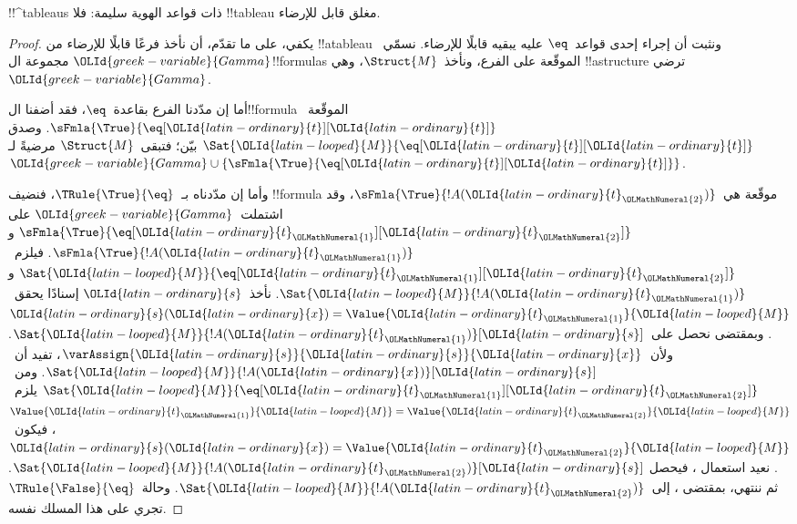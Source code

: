 \documentclass[../../../include/open-logic-section]{subfiles}
\begin{document}


\begin{prop}
!!^{tableau}s ذات قواعد الهوية سليمة: فلا !!{tableau} مغلق قابل للإرضاء.
\end{prop}

\begin{proof}
يكفي، على ما تقدّم، أن نأخذ فرعًا قابلًا للإرضاء من !!a{tableau}
ونثبت أن إجراء إحدى قواعد~$\eq$ عليه يبقيه قابلًا للإرضاء.
نسمّي~$\OLId{greek-variable}{Gamma}$ مجموعة ال!!{formula}s الموقّعة على الفرع،
ونأخذ~$\Struct{M}$، وهي !!a{structure} ترضي~$\OLId{greek-variable}{Gamma}$.

أما إن مدّدنا الفرع بقاعدة~$\eq$، فقد أضفنا ال!!{formula}
الموقّعة~$\sFmla{\True}{\eq[\OLId{latin-ordinary}{t}][\OLId{latin-ordinary}{t}]}$. وصدق
$\Sat{\OLId{latin-looped}{M}}{\eq[\OLId{latin-ordinary}{t}][\OLId{latin-ordinary}{t}]}$ بيّن؛ فتبقى~$\Struct{M}$ مرضيةً
لـ~$\OLId{greek-variable}{Gamma} \cup
\{\sFmla{\True}{\eq[\OLId{latin-ordinary}{t}][\OLId{latin-ordinary}{t}]}\}$.

وأما إن مدّدناه بـ~$\TRule{\True}{\eq}$، فنضيف !!{formula}
موقّعة هي~$\sFmla{\True}{!A(\OLId{latin-ordinary}{t}_\OLMathNumeral{2})}$، وقد اشتملت~$\OLId{greek-variable}{Gamma}$ على
$\sFmla{\True}{\eq[\OLId{latin-ordinary}{t}_\OLMathNumeral{1}][\OLId{latin-ordinary}{t}_\OLMathNumeral{2}]}$ و$\sFmla{\True}{!A(\OLId{latin-ordinary}{t}_\OLMathNumeral{1})}$.
فيلزم~$\Sat{\OLId{latin-looped}{M}}{\eq[\OLId{latin-ordinary}{t}_\OLMathNumeral{1}][\OLId{latin-ordinary}{t}_\OLMathNumeral{2}]}$ و$\Sat{\OLId{latin-looped}{M}}{!A(\OLId{latin-ordinary}{t}_\OLMathNumeral{1})}$.
نأخذ~$\OLId{latin-ordinary}{s}$ إسنادًا يحقق~$\OLId{latin-ordinary}{s}(\OLId{latin-ordinary}{x}) = \Value{\OLId{latin-ordinary}{t}_\OLMathNumeral{1}}{\OLId{latin-looped}{M}}$.
وبمقتضى 
نحصل على~$\Sat{\OLId{latin-looped}{M}}{!A(\OLId{latin-ordinary}{t}_\OLMathNumeral{1})}[\OLId{latin-ordinary}{s}]$. ولأن~$\varAssign{\OLId{latin-ordinary}{s}}{\OLId{latin-ordinary}{s}}{\OLId{latin-ordinary}{x}}$،
تفيد  أن~$\Sat{\OLId{latin-looped}{M}}{!A(\OLId{latin-ordinary}{x})}[\OLId{latin-ordinary}{s}]$.
ومن~$\Sat{\OLId{latin-looped}{M}}{\eq[\OLId{latin-ordinary}{t}_\OLMathNumeral{1}][\OLId{latin-ordinary}{t}_\OLMathNumeral{2}]}$ يلزم~$\Value{\OLId{latin-ordinary}{t}_\OLMathNumeral{1}}{\OLId{latin-looped}{M}} = \Value{\OLId{latin-ordinary}{t}_\OLMathNumeral{2}}{\OLId{latin-looped}{M}}$،
فيكون~$\OLId{latin-ordinary}{s}(\OLId{latin-ordinary}{x}) = \Value{\OLId{latin-ordinary}{t}_\OLMathNumeral{2}}{\OLId{latin-looped}{M}}$. نعيد استعمال
، فيحصل
$\Sat{\OLId{latin-looped}{M}}{!A(\OLId{latin-ordinary}{t}_\OLMathNumeral{2})}[\OLId{latin-ordinary}{s}]$. ثم ننتهي، بمقتضى
، إلى~$\Sat{\OLId{latin-looped}{M}}{!A(\OLId{latin-ordinary}{t}_\OLMathNumeral{2})}$.
وحالة~$\TRule{\False}{\eq}$ تجري على هذا المسلك نفسه.
\end{proof}
\end{document}
